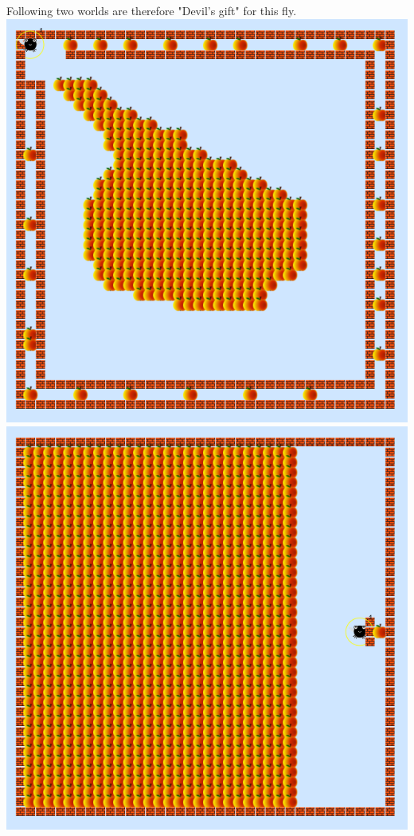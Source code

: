 \documentclass[12pt,a4paper]{report}
\begin{document}
\newpage

Following two worlds are therefore "Devil's gift" for this fly.\\

\includegraphics[scale=0.4]{fly/2.png}
\includegraphics[scale=0.4]{fly/3.png}\\
\end{document}
